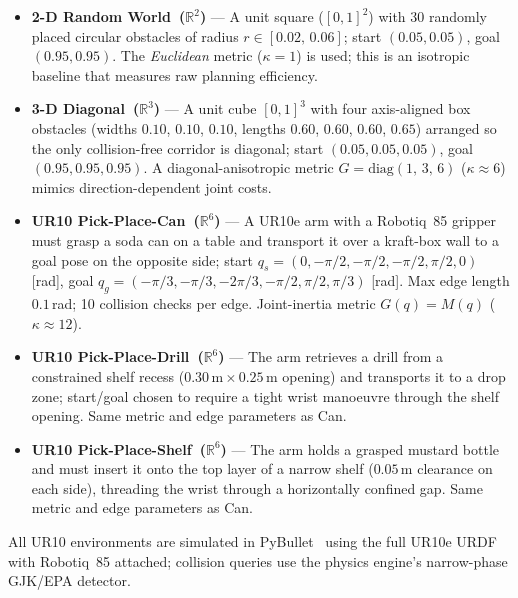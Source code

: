 \documentclass[journal]{IEEEtran}
\begin{document}
\begin{itemize}
  \item \textbf{2-D Random World~($\mathbb{R}^{2}$)} --- A unit
    square ($[0,1]^2$) with 30 randomly placed circular obstacles
    of radius $r \in [0.02,\,0.06]$; start $(0.05,0.05)$, goal
    $(0.95,0.95)$.
    The \emph{Euclidean} metric ($\kappa=1$) is used; this is an
    isotropic baseline that measures raw planning efficiency.

  \item \textbf{3-D Diagonal~($\mathbb{R}^{3}$)} --- A unit cube
    $[0,1]^3$ with four axis-aligned box obstacles (widths
    $0.10$, $0.10$, $0.10$, lengths $0.60$, $0.60$, $0.60$,
    $0.65$) arranged so the only collision-free corridor is
    diagonal; start $(0.05,0.05,0.05)$, goal $(0.95,0.95,0.95)$.
    A diagonal-anisotropic metric
    $G = \mathrm{diag}(1,\,3,\,6)$ ($\kappa\approx 6$) mimics
    direction-dependent joint costs.

  \item \textbf{UR10 Pick-Place-Can~($\mathbb{R}^{6}$)} --- A
    UR10e arm with a Robotiq~85 gripper must grasp a soda can on a
    table and transport it over a kraft-box wall to a goal pose on
    the opposite side; start $q_s = (0,-\pi/2,-\pi/2,-\pi/2,\pi/2,0)$
    [rad], goal $q_g = (-\pi/3,-\pi/3,-2\pi/3,-\pi/2,\pi/2,\pi/3)$
    [rad].
    Max edge length $0.1$\,rad; 10 collision checks per edge.
    Joint-inertia metric $G(q)=M(q)$ ($\kappa \approx 12$).

  \item \textbf{UR10 Pick-Place-Drill~($\mathbb{R}^{6}$)} --- The
    arm retrieves a drill from a constrained shelf recess
    ($0.30\,\text{m} \times 0.25\,\text{m}$ opening) and
    transports it to a drop zone; start/goal chosen to require a
    tight wrist manoeuvre through the shelf opening.
    Same metric and edge parameters as Can.

  \item \textbf{UR10 Pick-Place-Shelf~($\mathbb{R}^{6}$)} --- The
    arm holds a grasped mustard bottle and must insert it onto the
    top layer of a narrow shelf ($0.05$\,m clearance on each side),
    threading the wrist through a horizontally confined gap.
    Same metric and edge parameters as Can.
\end{itemize}

All UR10 environments are simulated in
PyBullet~\cite{Coumans2021} using the full UR10e URDF with
Robotiq~85 attached; collision queries use the physics engine's
narrow-phase GJK/EPA detector.
\end{document}
